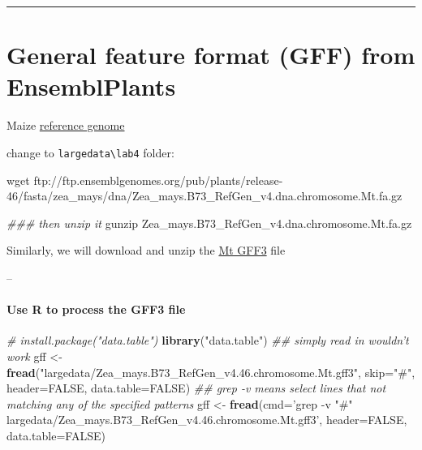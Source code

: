 \documentclass[]{article}
\newenvironment{Shaded}{\begin{snugshade}}{\end{snugshade}}
\newcommand{\CommentTok}[1]{\textcolor[rgb]{0.56,0.35,0.01}{\textit{#1}}}
\newcommand{\DataTypeTok}[1]{\textcolor[rgb]{0.13,0.29,0.53}{#1}}
\newcommand{\FunctionTok}[1]{\textcolor[rgb]{0.00,0.00,0.00}{#1}}
\newcommand{\KeywordTok}[1]{\textcolor[rgb]{0.13,0.29,0.53}{\textbf{#1}}}
\newcommand{\NormalTok}[1]{#1}
\newcommand{\OtherTok}[1]{\textcolor[rgb]{0.56,0.35,0.01}{#1}}
\newcommand{\StringTok}[1]{\textcolor[rgb]{0.31,0.60,0.02}{#1}}
\let\oldparagraph\paragraph
\renewcommand{\paragraph}[1]{\oldparagraph{#1}\mbox{}}
\begin{document}
\begin{center}\rule{0.5\linewidth}{0.5pt}\end{center}

\hypertarget{general-feature-format-gff-from-ensemblplants}{%
\section{General feature format (GFF) from
EnsemblPlants}\label{general-feature-format-gff-from-ensemblplants}}

Maize \href{https://plants.ensembl.org/Zea_mays/Info/Index}{reference
genome}

change to \texttt{largedata\textbackslash{}lab4} folder:

\begin{Shaded}
\begin{Highlighting}[]
\FunctionTok{wget}\NormalTok{ ftp://ftp.ensemblgenomes.org/pub/plants/release-46/fasta/zea_mays/dna/Zea_mays.B73_RefGen_v4.dna.chromosome.Mt.fa.gz}

\CommentTok{### then unzip it}
\FunctionTok{gunzip}\NormalTok{ Zea_mays.B73_RefGen_v4.dna.chromosome.Mt.fa.gz}
\end{Highlighting}
\end{Shaded}

Similarly, we will download and unzip the
\href{ftp://ftp.ensemblgenomes.org/pub/plants/release-46/gff3/zea_mays/Zea_mays.B73_RefGen_v4.46.chromosome.Mt.gff3.gz}{Mt
GFF3} file

--

\hypertarget{use-r-to-process-the-gff3-file}{%
\paragraph{Use R to process the GFF3
file}\label{use-r-to-process-the-gff3-file}}

\begin{Shaded}
\begin{Highlighting}[]
\CommentTok{# install.package("data.table")}
\KeywordTok{library}\NormalTok{(}\StringTok{"data.table"}\NormalTok{)}
\CommentTok{## simply read in wouldn't work}
\NormalTok{gff <-}\StringTok{ }\KeywordTok{fread}\NormalTok{(}\StringTok{"largedata/Zea_mays.B73_RefGen_v4.46.chromosome.Mt.gff3"}\NormalTok{, }\DataTypeTok{skip=}\StringTok{"#"}\NormalTok{, }\DataTypeTok{header=}\OtherTok{FALSE}\NormalTok{, }\DataTypeTok{data.table=}\OtherTok{FALSE}\NormalTok{)}
\CommentTok{## grep -v means select lines that not matching any of the specified patterns}
\NormalTok{gff <-}\StringTok{ }\KeywordTok{fread}\NormalTok{(}\DataTypeTok{cmd=}\StringTok{'grep -v "#" largedata/Zea_mays.B73_RefGen_v4.46.chromosome.Mt.gff3'}\NormalTok{, }\DataTypeTok{header=}\OtherTok{FALSE}\NormalTok{, }\DataTypeTok{data.table=}\OtherTok{FALSE}\NormalTok{)}
\end{Highlighting}
\end{Shaded}
\end{document}
